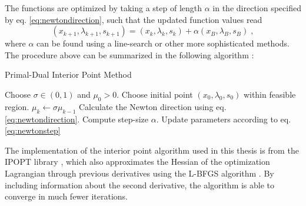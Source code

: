 The functions are optimized by taking a step of length $\alpha$ in the direction specified by eq. \eqref{eq:newtondirection}, such that the updated function values read
\begin{equation}
	(x_{k+1} , \lambda_{k+1} , s _{k+1}) = (x_{k} , \lambda_{k} , s _{k}) + \alpha  (x_B , \lambda_B , s_B) \; , \label{eq:newtonstep}
\end{equation}
where $\alpha$ can be found using a line-search or other more sophisticated methods.
The procedure above can be summarized in the following algorithm \cite{ipnote}:\\
\begin{algorithm}
\begin{algorithmic}
\caption{Primal-Dual Interior Point Method}
\State Choose $\sigma \in (0,1)$ and $\mu_0 > 0$.
\State Choose initial point $(x_0 , \lambda_0 , s_0)$ within feasible region.
	\State $\mu_k \gets \sigma \mu_{k-1}$
	\State Calculate the Newton direction using eq. \eqref{eq:newtondirection}.
	\State Compute step-size $\alpha$.
	\State Update parameters according to eq. \eqref{eq:newtonstep}
\EndFor
\end{algorithmic}
\end{algorithm}

The implementation of the interior point algorithm used in this thesis is from the IPOPT library \cite{Wachter2006}, which also approximates the Hessian of the optimization Lagrangian through previous derivatives using the L-BFGS algorithm \cite{Liu1989}. By including information about the second derivative, the algorithm is able to converge in much fewer iterations. 


